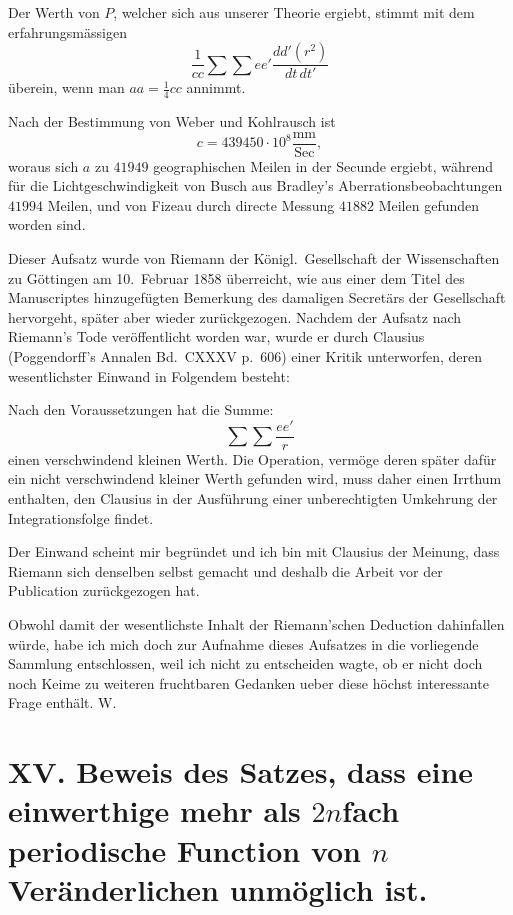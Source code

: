 \documentclass[12pt,a4paper]{article}
\begin{document}
Der Werth von $P$, welcher sich aus unserer Theorie ergiebt, stimmt mit dem erfahrungsm\"assigen
\[\frac{1}{cc} \sum\sum ee' \frac{dd'(r^{2})}{dt\,dt'}\]
\"uberein, wenn man $aa = \frac{1}{4}cc$ annimmt.

Nach der Bestimmung von Weber und Kohlrausch ist
\[c = 439450 \cdot 10^{8} \frac{\text{mm}}{\text{Sec}},\]
woraus sich $a$ zu $41949$ geographischen Meilen in der Secunde ergiebt, w\"ahrend f\"ur die Lichtgeschwindigkeit von Busch aus Bradley's Aberrationsbeobachtungen $41994$ Meilen, und von Fizeau durch directe Messung $41882$ Meilen gefunden worden sind.

\medskip
\noindent\small Dieser Aufsatz wurde von Riemann der K\"onigl.\ Gesellschaft der Wissenschaften zu G\"ottingen am 10.\ Februar 1858 \"uberreicht, wie aus einer dem Titel des Manuscriptes hinzugef\"ugten Bemerkung des damaligen Secret\"ars der Gesellschaft hervorgeht, sp\"ater aber wieder zur\"uckgezogen. Nachdem der Aufsatz nach Riemann's Tode ver\"offentlicht worden war, wurde er durch Clausius (Poggendorff's Annalen Bd.~CXXXV p.~606) einer Kritik unterworfen, deren wesentlichster Einwand in Folgendem besteht:

Nach den Voraussetzungen hat die Summe:
\[\sum\sum \frac{ee'}{r}\]
einen verschwindend kleinen Werth. Die Operation, verm\"oge deren sp\"ater daf\"ur ein nicht verschwindend kleiner Werth gefunden wird, muss daher einen Irrthum enthalten, den Clausius in der Ausf\"uhrung einer unberechtigten Umkehrung der Integrationsfolge findet.

Der Einwand scheint mir begr\"undet und ich bin mit Clausius der Meinung, dass Riemann sich denselben selbst gemacht und deshalb die Arbeit vor der Publication zur\"uckgezogen hat.

Obwohl damit der wesentlichste Inhalt der Riemann'schen Deduction dahinfallen w\"urde, habe ich mich doch zur Aufnahme dieses Aufsatzes in die vorliegende Sammlung entschlossen, weil ich nicht zu entscheiden wagte, ob er nicht doch noch Keime zu weiteren fruchtbaren Gedanken ueber diese h\"ochst interessante Frage enth\"alt. W.

\newpage
\section*{XV. Beweis des Satzes, dass eine einwerthige mehr als $2n$fach periodische Function von $n$ Ver\"anderlichen unm\"oglich ist.}
\end{document}

